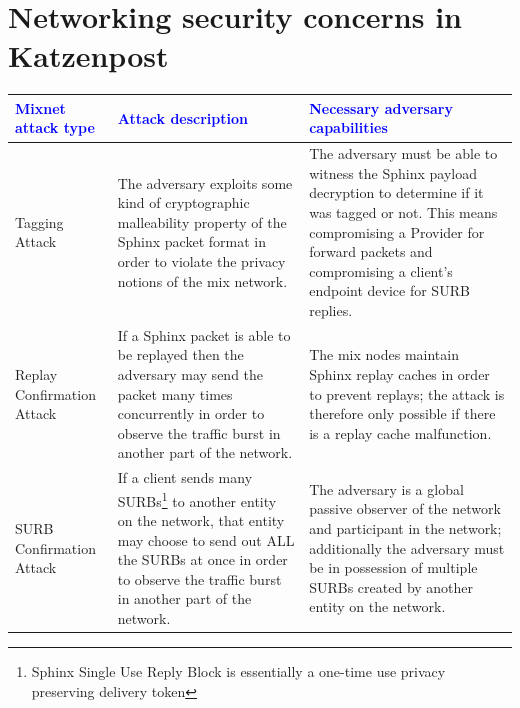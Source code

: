\documentclass{article}
\begin{document}
\normalsize

\section{Networking security concerns in Katzenpost}
\begin{center}
\selectfont
\begin{tabularx}{\textwidth}[t]{|m{}| m{}| m{}| }
\arrayrulecolor{blue}\hline 
\rowcolor{lightBlue} 
\textbf{\textcolor{blue}{Mixnet \linebreak attack type}} & \textbf{\textcolor{blue}{Attack description}} & \textbf{\textcolor{blue}{Necessary adversary capabilities}} \\

\hline Tagging Attack & The adversary exploits some kind of cryptographic malleability property of the Sphinx packet format in order to violate the privacy notions of the mix network. 
& The adversary must be able to witness the Sphinx payload decryption to determine if it was tagged or not. This means compromising a Provider for forward packets and compromising a client's endpoint device for SURB replies.\\

\hline Replay Confirmation Attack & If a Sphinx packet is able to be replayed then the adversary may send the packet many times concurrently in order to observe the traffic burst in another part of the network.  & The mix nodes maintain Sphinx replay caches in order to prevent replays; the attack is therefore only possible if there is a replay cache malfunction. \\

\hline SURB Confirmation Attack & If a client sends many SURBs\footnote{Sphinx Single Use Reply Block is essentially a one-time use privacy preserving delivery token} to another entity on the network, that entity may choose to send out ALL the SURBs at once in order to observe the traffic burst in another part of the network. & The adversary is a global passive observer of the network and participant in the network; additionally the adversary must be in possession of multiple SURBs created by another entity on the network. \\


\end{tabularx}
\end{center}
\end{document}
